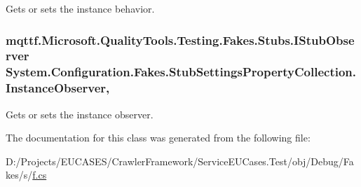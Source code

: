 Gets or sets the instance behavior.

\hypertarget{class_system_1_1_configuration_1_1_fakes_1_1_stub_settings_property_collection_acd2935941119a3f98c51476e4bc41d7b}{
\subsubsection[{Instance\-Observer}]{\setlength{\rightskip}{0pt plus 5cm}mqttf.\-Microsoft.\-Quality\-Tools.\-Testing.\-Fakes.\-Stubs.\-I\-Stub\-Observer System.\-Configuration.\-Fakes.\-Stub\-Settings\-Property\-Collection.\-Instance\-Observer\hspace{0.3cm}{\ttfamily [get]}, {\ttfamily [set]}}}\label{class_system_1_1_configuration_1_1_fakes_1_1_stub_settings_property_collection_acd2935941119a3f98c51476e4bc41d7b}


Gets or sets the instance observer.



The documentation for this class was generated from the following file\-:\begin{DoxyCompactItemize}
\item 
D\-:/\-Projects/\-E\-U\-C\-A\-S\-E\-S/\-Crawler\-Framework/\-Service\-E\-U\-Cases.\-Test/obj/\-Debug/\-Fakes/s/\hyperlink{s_2f_8cs}{f.\-cs}\end{DoxyCompactItemize}
